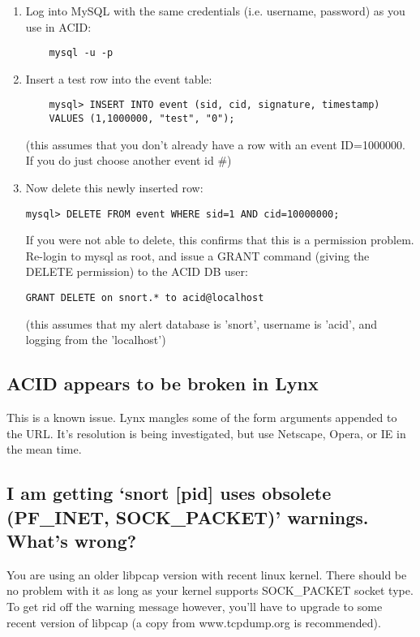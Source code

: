\documentclass{article}
\begin{document}
\begin{enumerate}
\item Log into MySQL with the same credentials (i.e. username, password) as you use in ACID:
	\begin{verbatim}
	mysql -u -p
	\end{verbatim}
\item Insert a test row into the event table: 
	\begin{verbatim}
	mysql> INSERT INTO event (sid, cid, signature, timestamp) 
	VALUES (1,1000000, "test", "0");
	\end{verbatim}
	(this assumes that you don't already have a row with an event ID=1000000. If
	you do just choose another event id \#) 

\item Now delete this newly inserted row:

\begin{verbatim}mysql> DELETE FROM event WHERE sid=1 AND cid=10000000; \end{verbatim}

If you were not able to delete, this confirms that this is a permission
problem. Re-login to mysql as root, and issue a GRANT command (giving the
DELETE permission) to the ACID DB user: 

\begin{verbatim}GRANT DELETE on snort.* to acid@localhost\end{verbatim}

(this assumes that my alert database is 'snort', username is 'acid', and
logging from the 'localhost') 

\end{enumerate}
\subsection{ACID appears to be broken in Lynx }

This is a known issue. Lynx mangles some of the form arguments appended to
the URL. It's resolution is being investigated, but use Netscape, Opera, or
IE in the mean time. 

\subsection{I am getting `snort [pid] uses obsolete (PF\_INET, SOCK\_PACKET)' warnings. What's wrong?}

You are using an older libpcap version with recent linux kernel. There should be
no problem with it as long as your kernel supports SOCK\_PACKET socket 
type. To get rid off the warning message however, you'll have to upgrade 
to some recent version of libpcap (a copy from www.tcpdump.org is recommended).
\end{document}
